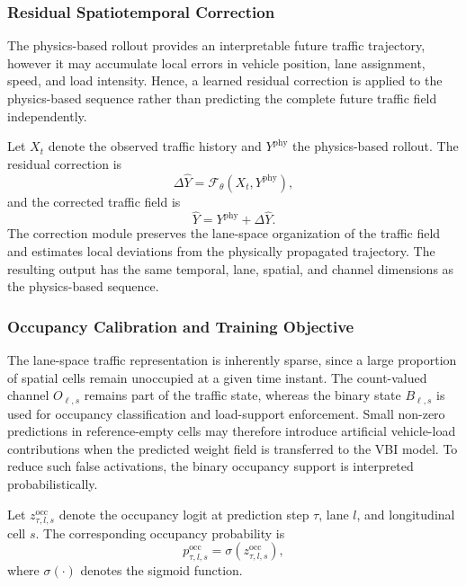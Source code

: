 \documentclass[journal]{IEEEtran}
\begin{document}
\subsubsection{Residual Spatiotemporal Correction}

The physics-based rollout provides an interpretable future traffic trajectory, however it may accumulate local errors in vehicle position, lane assignment, speed, and load intensity. Hence, a learned residual correction is applied to the physics-based sequence rather than predicting the complete future traffic field independently.

Let $X_t$ denote the observed traffic history and $Y^{\mathrm{phy}}$ the physics-based rollout. The residual correction is
\begin{equation}
\Delta\widehat{Y}=\mathcal{F}_{\theta}\left(X_t,Y^{\mathrm{phy}}\right),
\end{equation}
and the corrected traffic field is
\begin{equation}
\widehat{Y}=Y^{\mathrm{phy}}+\Delta\widehat{Y}.
\end{equation}
The correction module preserves the lane-space organization of the traffic field and estimates local deviations from the physically propagated trajectory. The resulting output has the same temporal, lane, spatial, and channel dimensions as the physics-based sequence.

\subsubsection{Occupancy Calibration and Training Objective}
\label{sec:occupancy_training}

The lane-space traffic representation is inherently sparse, since a large proportion of spatial cells remain unoccupied at a given time instant. The count-valued channel $O_{\ell,s}$ remains part of the traffic state, whereas the binary state $B_{\ell,s}$ is used for occupancy classification and load-support enforcement. Small non-zero predictions in reference-empty cells may therefore introduce artificial vehicle-load contributions when the predicted weight field is transferred to the VBI model. To reduce such false activations, the binary occupancy support is interpreted probabilistically.

Let $z_{\tau,l,s}^{\mathrm{occ}}$ denote the occupancy logit at prediction step $\tau$, lane $l$, and longitudinal cell $s$. The corresponding occupancy probability is
\begin{equation}
p_{\tau,l,s}^{\mathrm{occ}}=\sigma\left(z_{\tau,l,s}^{\mathrm{occ}}\right),
\end{equation}
where $\sigma(\cdot)$ denotes the sigmoid function.
\end{document}
